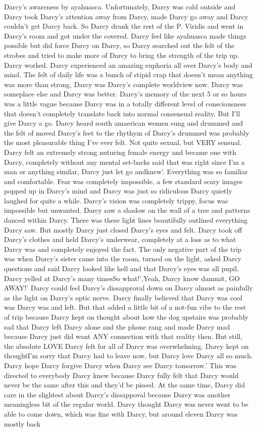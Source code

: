 \documentclass[12pt]{book}
\begin{document}
Darcy's awareness by ayahuasca. Unfortunately, Darcy was cold outside and Darcy took Darcy's attention away from Darcy, made Darcy go away and Darcy couldn't get Darcy back. So Darcy drank the rest of the P. Viridis and went in Darcy's room and got under the covered. Darcy feel like ayahuasca made things possible but did force Darcy on Darcy, so Darcy searched out the felt of the strobes and tried to make more of Darcy to bring the strength of the trip up. Darcy worked. Darcy experienced an amazing euphoria all over Darcy's body and mind. The felt of daily life was a bunch of stipid crap that doesn't mean anything was more than strong, Darcy was Darcy's complete worldview now. Darcy was someplace else and Darcy was better. Darcy's memory of the next 5 or so hours was a little vague because Darcy was in a totally different level of consciousness that doesn't completely translate back into normal consensual reality. But I'll give Darcy a go. Darcy heard south amaerican women sung and drummed and the felt of moved Darcy's feet to the rhythym of Darcy's drummed was probably the most pleasurable thing I've ever felt. Not quite sexual, but VERY sensual. Darcy felt an extremely strong nuturing female energy and became one with Darcy, completely without any mental set-backs said that was right since I'm a man or anything similar, Darcy just let go andknew'. Everything was so familiar and comfortable. Fear was completely impossible, a few standard scary images popped up in Darcy's mind and Darcy was just so ridiculous Darcy quietly laughed for quite a while. Darcy's vision was completely trippy, focus was impossible but unwanted. Darcy saw a shadow on the wall of a tree and patterns danced within Darcy. There was these light lines beautifully outlined everything Darcy saw. But mostly Darcy just closed Darcy's eyes and felt. Darcy took off Darcy's clothes and held Darcy's underwear, completely at a loss as to what Darcy was and completely enjoyed the fact. The only negative part of the trip was when Darcy's sister came into the room, turned on the light, asked Darcy questions and said Darcy looked like hell and that Darcy's eyes was all pupil. Darcy yelled at Darcy's many timesSo what!',Yeah, Darcy know dammit, GO AWAY!' Darcy could feel Darcy's dissapproval  down on Darcy almost as painfully as the light on Darcy's optic nerve. Darcy finally believed that Darcy was cool was Darcy was and left. But that added a little bit of a not-fun vibe to the rest of trip because Darcy kept on thought about how the dog upstairs was probably sad that Darcy left Darcy alone and the phone rang and made Darcy mad because Darcy just did want ANY connection with that reality then. But still, the absolute LOVE Darcy felt for all of Darcy was overwhelming. Darcy kept on thoughtI'm sorry that Darcy had to leave now, but Darcy love Darcy all so much. Darcy hope Darcy forgive Darcy when Darcy see Darcy tomorrow.' This was directed to everybody Darcy knew because Darcy fully felt that Darcy would never be the same after this and they'd be pissed. At the same time, Darcy did care in the slightest about Darcy's dissappoval because Darcy was another meaningless bit of the regular world. Darcy thought Darcy was never went to be able to come down, which was fine with Darcy, but around eleven Darcy was mostly back 
\end{document}
